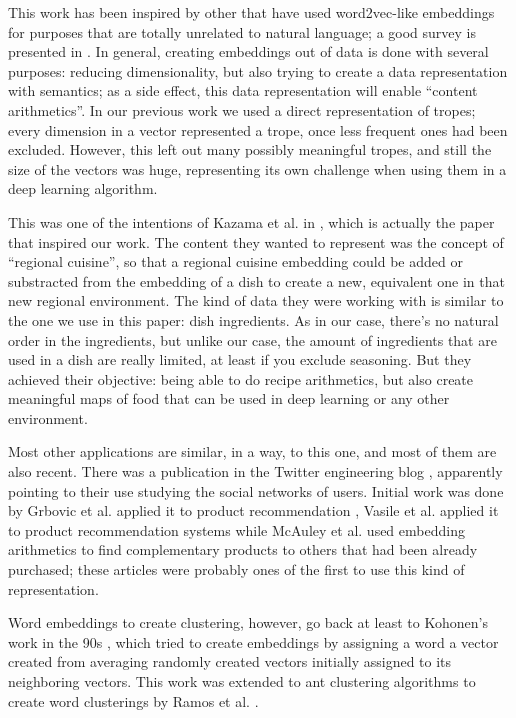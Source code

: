 \documentclass[letterpaper]{article}
\begin{document}
	This work has been inspired by other that have used
	word2vec-like embeddings for purposes that are totally
	unrelated to natural language; a good survey is presented in
	\cite{nonnlp19}. In general, creating embeddings out of data
	is done with several purposes: reducing dimensionality, but
	also trying to create a data representation with semantics; as
	a side effect, this data representation will enable ``content
	arithmetics''. In our previous work
	\cite{doi:10.1111/exsy.12525} we used a direct representation
	of tropes; every dimension in a vector represented a trope,
	once less frequent ones had been excluded. However, this left
	out many possibly meaningful tropes, and still the size of the
	vectors was huge, representing its own challenge when using
	them in a deep learning algorithm.
	
	This was one of the intentions of Kazama et al. in
	\cite{kazama2018}, which is actually the paper that inspired
	our work. The content they wanted to represent was the concept
	of ``regional cuisine'', so that a regional cuisine embedding
	could be added or substracted from the embedding of a dish to
	create a new, equivalent one in that new regional
	environment. The kind of data they were working with is
	similar to the one we use in this paper: dish ingredients. As
	in our case, there's no natural order in the ingredients, but
	unlike our case, the amount of ingredients that are used in a
	dish are really limited, at least if you exclude
	seasoning. But they achieved their objective: being able to do
	recipe arithmetics, but also create meaningful maps of food
	that can be used in deep learning or any other environment.
	
	Most other applications are similar, in a way, to this one,
	and most of them are also recent. There was a publication in
	the Twitter engineering blog \cite{twitter:embeddings},
	apparently pointing to their use studying the social networks
	of users. Initial work was done by Grbovic et al. applied it to product recommendation
	\cite{Grbovic2015}, Vasile et al. applied it to product
	recommendation systems \cite{vasile2016} while McAuley et
	al. \cite{DBLP:journals/corr/McAuleyPL15} used embedding
	arithmetics to find complementary products to others that had
	been already purchased; these articles were
	probably ones of the first to use this kind of
	representation.
	
	Word embeddings to create clustering, however, go back at
	least to Kohonen's work in the 90s
	\cite{kohonen1997exploration}, which tried to create
	embeddings by assigning a word a vector created from averaging
	randomly created vectors initially assigned to its neighboring
	vectors. This work was extended to ant clustering algorithms
	to create word clusterings by Ramos et
	al. \cite{DBLP:journals/corr/abs-cs-0412075}.
	
\end{document}
